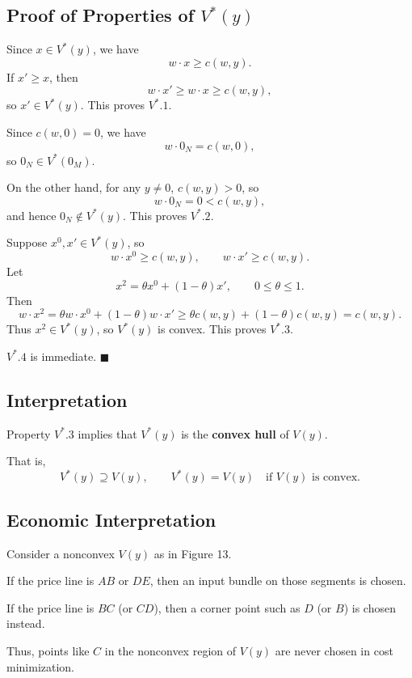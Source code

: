 \subsection*{Proof of Properties of $V^*(y)$}

Since $x \in V^*(y)$, we have
\[
w \cdot x \ge c(w,y).
\]
If $x' \ge x$, then
\[
w \cdot x' \ge w \cdot x \ge c(w,y),
\]
so $x' \in V^*(y)$. This proves $V^*.1$.

\medskip

Since $c(w,0)=0$, we have
\[
w \cdot 0_N = c(w,0),
\]
so $0_N \in V^*(0_M)$.

On the other hand, for any $y \ne 0$, $c(w,y)>0$, so
\[
w \cdot 0_N = 0 < c(w,y),
\]
and hence $0_N \notin V^*(y)$. This proves $V^*.2$.

\medskip

Suppose $x^0, x' \in V^*(y)$, so
\[
w \cdot x^0 \ge c(w,y),
\qquad
w \cdot x' \ge c(w,y).
\]
Let
\[
x^2 = \theta x^0 + (1-\theta)x', \qquad 0 \le \theta \le 1.
\]
Then
\[
w \cdot x^2
=
\theta w \cdot x^0 + (1-\theta) w \cdot x'
\ge
\theta c(w,y) + (1-\theta)c(w,y)
=
c(w,y).
\]
Thus $x^2 \in V^*(y)$, so $V^*(y)$ is convex. This proves $V^*.3$.

\medskip

$V^*.4$ is immediate. \hfill $\blacksquare$

\subsection*{Interpretation}

Property $V^*.3$ implies that $V^*(y)$ is the \textbf{convex hull} of $V(y)$.

That is,
\[
V^*(y) \supseteq V(y),
\qquad
V^*(y)=V(y) \quad \text{if $V(y)$ is convex}.
\]

\medskip

\subsection*{Economic Interpretation}

Consider a nonconvex $V(y)$ as in Figure 13.

If the price line is $AB$ or $DE$, then an input bundle on those segments is chosen.

If the price line is $BC$ (or $CD$), then a corner point such as $D$ (or $B$)
is chosen instead.

Thus, points like $C$ in the nonconvex region of $V(y)$ are never chosen
in cost minimization.

